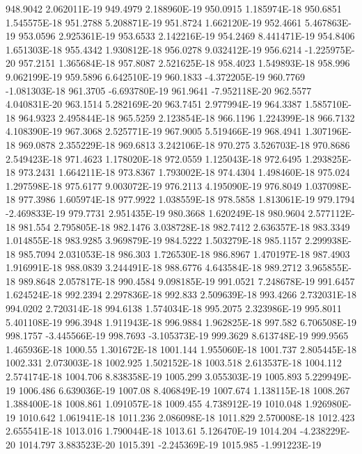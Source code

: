 948.9042  2.062011E-19
949.4979  2.188960E-19
950.0915  1.185974E-18
950.6851  1.545575E-18
951.2788  5.208871E-19
951.8724  1.662120E-19
952.4661  5.467863E-19
953.0596  2.925361E-19
953.6533  2.142216E-19
954.2469  8.441471E-19
954.8406  1.651303E-18
955.4342  1.930812E-18
956.0278  9.032412E-19
956.6214  -1.225975E-20
957.2151  1.365684E-18
957.8087  2.521625E-18
958.4023  1.549893E-18
958.996  9.062199E-19
959.5896  6.642510E-19
960.1833  -4.372205E-19
960.7769  -1.081303E-18
961.3705  -6.693780E-19
961.9641  -7.952118E-20
962.5577  4.040831E-20
963.1514  5.282169E-20
963.7451  2.977994E-19
964.3387  1.585710E-18
964.9323  2.495844E-18
965.5259  2.123854E-18
966.1196  1.224399E-18
966.7132  4.108390E-19
967.3068  2.525771E-19
967.9005  5.519466E-19
968.4941  1.307196E-18
969.0878  2.355229E-18
969.6813  3.242106E-18
970.275  3.526703E-18
970.8686  2.549423E-18
971.4623  1.178020E-18
972.0559  1.125043E-18
972.6495  1.293825E-18
973.2431  1.664211E-18
973.8367  1.793002E-18
974.4304  1.498460E-18
975.024  1.297598E-18
975.6177  9.003072E-19
976.2113  4.195090E-19
976.8049  1.037098E-18
977.3986  1.605974E-18
977.9922  1.038559E-18
978.5858  1.813061E-19
979.1794  -2.469833E-19
979.7731  2.951435E-19
980.3668  1.620249E-18
980.9604  2.577112E-18
981.554  2.795805E-18
982.1476  3.038728E-18
982.7412  2.636357E-18
983.3349  1.014855E-18
983.9285  3.969879E-19
984.5222  1.503279E-18
985.1157  2.299938E-18
985.7094  2.031053E-18
986.303  1.726530E-18
986.8967  1.470197E-18
987.4903  1.916991E-18
988.0839  3.244491E-18
988.6776  4.643584E-18
989.2712  3.965855E-18
989.8648  2.057817E-18
990.4584  9.098185E-19
991.0521  7.248678E-19
991.6457  1.624524E-18
992.2394  2.297836E-18
992.833  2.509639E-18
993.4266  2.732031E-18
994.0202  2.720314E-18
994.6138  1.574034E-18
995.2075  2.323986E-19
995.8011  5.401108E-19
996.3948  1.911943E-18
996.9884  1.962825E-18
997.582  6.706508E-19
998.1757  -3.445566E-19
998.7693  -3.105373E-19
999.3629  8.613748E-19
999.9565  1.465936E-18
1000.55  1.301672E-18
1001.144  1.955060E-18
1001.737  2.805445E-18
1002.331  2.073003E-18
1002.925  1.502152E-18
1003.518  2.613537E-18
1004.112  2.574174E-18
1004.706  8.838358E-19
1005.299  3.055303E-19
1005.893  5.229949E-19
1006.486  6.639036E-19
1007.08  8.406849E-19
1007.674  1.138115E-18
1008.267  1.388400E-18
1008.861  1.091057E-18
1009.455  4.738912E-19
1010.048  1.926980E-19
1010.642  1.061941E-18
1011.236  2.086098E-18
1011.829  2.570008E-18
1012.423  2.655541E-18
1013.016  1.790044E-18
1013.61  5.126470E-19
1014.204  -4.238229E-20
1014.797  3.883523E-20
1015.391  -2.245369E-19
1015.985  -1.991223E-19
